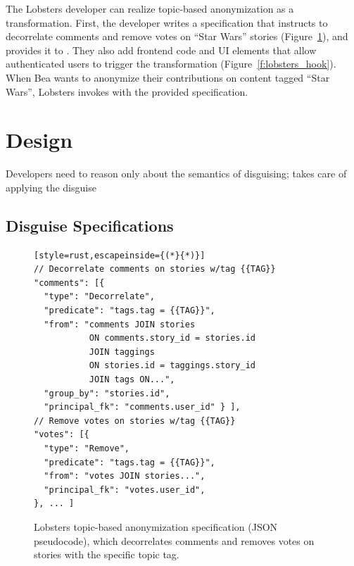 %
The Lobsters developer can realize topic-based anonymization as a \xxing
transformation.
%
First, the developer writes a \xx specification that instructs \sys to
decorrelate comments and remove votes on ``Star Wars'' stories
(Figure~\ref{f:spec}), and provides it to \sys.
%
They also add frontend code and UI elements that allow authenticated users to
trigger the \xxing transformation (Figure~\ref{f:lobsters_hook}).
%
When Bea wants to anonymize their contributions on content tagged ``Star Wars'',
Lobsters invokes \sys with the provided specification.

\section{Design}

Developers need to reason only about the semantics of disguising; \sys takes
care of applying the disguise 

\subsection{Disguise Specifications}
\label{s:spec}

\begin{figure}[t]
\centering
\begin{lstlisting}[style=rust,escapeinside={(*}{*)}]
// Decorrelate comments on stories w/tag {{TAG}}
"comments": [{
  "type": "Decorrelate",
  "predicate": "tags.tag = {{TAG}}",
  "from": "comments JOIN stories
           ON comments.story_id = stories.id
           JOIN taggings
           ON stories.id = taggings.story_id
           JOIN tags ON...",
  "group_by": "stories.id",
  "principal_fk": "comments.user_id" } ],
// Remove votes on stories w/tag {{TAG}}
"votes": [{
  "type": "Remove",
  "predicate": "tags.tag = {{TAG}}",
  "from": "votes JOIN stories...",
  "principal_fk": "votes.user_id",
}, ... ]
\end{lstlisting}
    \caption{Lobsters topic-based anonymization \xx specification (JSON
    pseudocode), which decorrelates comments and removes votes on stories with
    the specific topic tag.}
\label{f:spec}
\end{figure}

